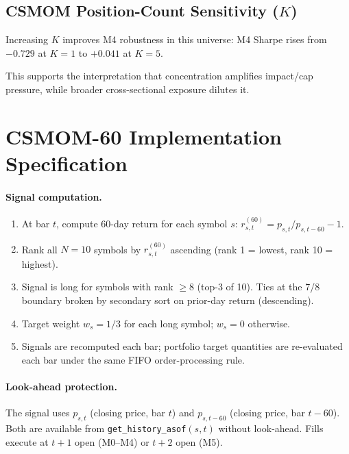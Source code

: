 \documentclass[12pt]{article}
\begin{document}
\subsection{CSMOM Position-Count Sensitivity ($K$)}

\begin{table}[H]
\centering
\caption{CSMOM top-$K$ sensitivity (lookback fixed at $J=60$) under
M0 (na\"{i}ve) and M4 (+impact), full sample 2005--2025. Point
estimates only (no bootstrap CIs).}
\label{tab:csmom_k_sensitivity}
\small

\begin{tablenotes}\small
\item Increasing $K$ improves M4 robustness in this universe: M4 Sharpe
rises from $-0.729$ at $K=1$ to $+0.041$ at $K=5$.
\item This supports the interpretation that concentration amplifies
impact/cap pressure, while broader cross-sectional exposure dilutes it.
\end{tablenotes}
\end{table}

\section{CSMOM-60 Implementation Specification}
\label{app:csmom_spec}

\paragraph{Signal computation.}
\begin{enumerate}[nosep, label=\arabic*.]
  \item At bar $t$, compute 60-day return for each symbol $s$:
    $r^{(60)}_{s,t} = p_{s,t}/p_{s,t-60} - 1$.
  \item Rank all $N=10$ symbols by $r^{(60)}_{s,t}$ ascending
    (rank 1 = lowest, rank 10 = highest).
  \item Signal is long for symbols with rank $\ge 8$ (top-3 of 10).
    Ties at the 7/8 boundary broken by secondary sort on prior-day
    return (descending).
  \item Target weight $w_s = 1/3$ for each long symbol; $w_s = 0$
    otherwise.
  \item Signals are recomputed each bar; portfolio target quantities are
    re-evaluated each bar under the same FIFO order-processing rule.
\end{enumerate}

\paragraph{Look-ahead protection.}
The signal uses $p_{s,t}$ (closing price, bar $t$) and
$p_{s,t-60}$ (closing price, bar $t-60$). Both are available
from \texttt{get\_history\_asof}$(s, t)$ without look-ahead.
Fills execute at $t+1$ open (M0--M4) or $t+2$ open (M5).
\end{document}
